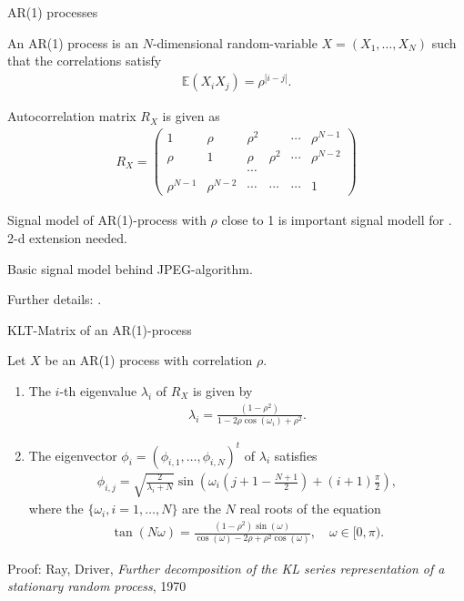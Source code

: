 \begin{frame}{AR(1) processes}
\bit
\item An AR(1) process is an $N$-dimensional random-variable $X=(X_1,\dots,X_N)$ such that the correlations satisfy
\begin{align*}
\mathbb{E}(X_iX_j)=\rho^{|i-j|}.
\end{align*}
\item Autocorrelation matrix $R_X$ is given as 
\begin{align*}
R_X=\begin{pmatrix}1 & \rho &\rho^2 && \cdots &\rho^{N-1} \\ \rho & 1 & \rho &\rho^2 &\cdots &\rho^{N-2}
\\
&&\cdots&&&\\
\rho^{N-1} &\rho^{N-2}&\cdots&\cdots&\cdots &1
\end{pmatrix}
\end{align*}
\item Signal model of AR(1)-process with $\rho$ close to 1 is important signal modell for . 2-d extension needed.
\item Basic signal model behind JPEG-algorithm. 
\item Further details: . 
\eit
\end{frame}

\begin{frame}{KLT-Matrix of an AR(1)-process}
\small
\begin{proposition}
Let $X$ be an AR(1) process with correlation $\rho$. 
\begin{enumerate}
\item The $i$-th eigenvalue $\lambda_i$ of $R_X$ is given by
\begin{align}\label{EqLambda}
\lambda_i = \frac{(1-\rho^2)}{1-2\rho\cos(\omega_i)+\rho^2}.
\end{align}
\item The eigenvector $\phi_i=(\phi_{i,1},\dots,\phi_{i,N})^t$ of $\lambda_i$ satisfies
\begin{align}\label{EqEVKLT}
\phi_{i,j}=\sqrt{\frac{2}{\lambda_i+N}}\sin\left(\omega_i\left(j+1-\frac{N+1}{2}\right)+(i+1)\frac{\pi}{2}\right),
\end{align}
where the $\{\omega_i,i=1,\dots,N\}$ are the $N$ real roots of the equation
\begin{align}\label{Eqomega}
\tan(N\omega)=\frac{(1-\rho^2)\sin(\omega)}{\cos(\omega)-2\rho+\rho^2\cos(\omega)}, \quad \omega \in [0,\pi).
\end{align}
\end{enumerate}
\end{proposition}
Proof: Ray, Driver, \textit{Further decomposition of the KL series representation of a stationary random process}, 1970
\end{frame}

